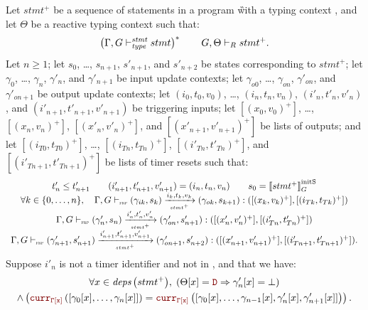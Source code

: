 \begin{skippableproof}
    Let $stmt^+$ be a sequence of statements in a program \G with a typing context \tyCtx, and
    let $\Theta$ be a reactive typing context such that:
    \begin{equation*}
        \left(\Gamma, G \vdash_{\textit{type}}^{\textit{stmt}} stmt\right)^* \qquad G, \Theta \vdash_R stmt^+.
    \end{equation*}
    Let $n \ge 1$;
    let $s_0$, \dots, $s_{n+1}$, $s'_{n+1}$, and $s'_{n+2}$ be states corresponding to $stmt^+$;
    let $\gamma_0$, \dots, $\gamma_n$, $\gamma'_n$, and $\gamma'_{n+1}$ be input update contexts;
    let $\gamma_{o0}$, \dots, $\gamma_{on}$, $\gamma'_{on}$, and $\gamma'_{on+1}$ be output update contexts;
    let $(i_0, t_0, v_0)$, \dots, $(i_n, t_n, v_n)$, $(i'_n, t'_n, v'_n)$, and $(i'_{n+1}, t'_{n+1}, v'_{n+1})$ be triggering inputs;
    let $[(x_0, v_0)^+]$, \dots, $[(x_n, v_n)^+]$, $[(x'_n, v'_n)^+]$, and $[(x'_{n+1}, v'_{n+1})^+]$ be lists of outputs; and
    let $[(i_{T0}, t_{T0})^+]$, \dots, $[(i_{Tn}, t_{Tn})^+]$, $[(i'_{Tn}, t'_{Tn})^+]$, and $[(i'_{Tn+1}, t'_{Tn+1})^+]$ be lists of timer resets
    such that:
    \begin{equation*}
        \begin{array}{c}
            t'_n \le t'_{n+1} \qquad (i'_{n+1}, t'_{n+1}, v'_{n+1}) = (i_n, t_n, v_n) \qquad  s_0 = \left\llbracket stmt^+ \right\rrbracket_G^\text{initS}                                       \\
            \forall k \in \{0, \dots, n\}, \quad \Gamma, G \vdash_{\textnormal{\tiny\textsc{frp}}} (\gamma_{ik}, s_k) \xrightarrow[\mbox{\tiny\ensuremath{stmt^+}}]{i_k, t_k, v_k} (\gamma_{ok}, s_{k+1}): ([(x_k, v_k)^+], [(i_{Tk}, t_{Tk})^+]) \\
            \Gamma, G \vdash_{\textnormal{\tiny\textsc{frp}}} (\gamma'_n, s_n) \xrightarrow[\mbox{\tiny\ensuremath{stmt^+}}]{i'_n, t'_n, v'_n} (\gamma'_{on}, s'_{n+1}): ([(x'_n, v'_n)^+], [(i'_{Tn}, t'_{Tn})^+])                               \\
            \Gamma, G \vdash_{\textnormal{\tiny\textsc{frp}}} (\gamma'_{n+1}, s'_{n+1}) \xrightarrow[\mbox{\tiny\ensuremath{stmt^+}}]{i'_{n+1}, t'_{n+1}, v'_{n+1}} (\gamma'_{on+1}, s'_{n+2}): ([(x'_{n+1}, v'_{n+1})^+], [(i'_{Tn+1}, t'_{Tn+1})^+]).
        \end{array}
    \end{equation*}
    Suppose $i'_n$ is not a timer identifier and not in , and that
    we have:
    \begin{multline*}
        \forall x \in \depSet{stmt^+}, \; \left(\Theta[x] = \dType \Rightarrow \gamma'_n[x] = \bot\right) \\
        \wedge \left(\CurrVal{\tyCtx[x]}{[\gamma_0[x], \dots, \gamma_n[x]]} = \CurrVal{\tyCtx[x]}{[\gamma_0[x], \dots, \gamma_{n-1}[x], \gamma'_n[x], \gamma'_{n+1}[x]]}\right).
    \end{multline*}


\end{skippableproof}
